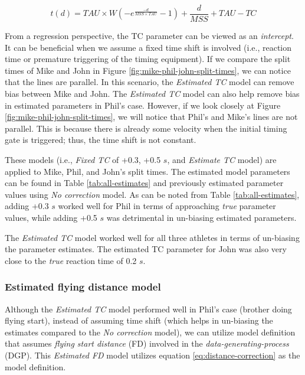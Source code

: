 \documentclass[fleqn,10pt]{wlpeerj} %
\begin{document}
\begin{equation}
  t(d) = TAU \times W(-e^{\frac{-d}{MSS \times TAU}} - 1) + \frac{d}{MSS} + TAU - TC \label{eq:time-correction}
\end{equation}

From a regression perspective, the TC parameter can be viewed as an \emph{intercept}. It can be beneficial when we assume a fixed time shift is involved (i.e., reaction time or premature triggering of the timing equipment). If we compare the split times of Mike and John in Figure \ref{fig:mike-phil-john-split-times}, we can notice that the lines are parallel. In this scenario, the \emph{Estimated TC} model can remove bias between Mike and John. The \emph{Estimated TC} model can also help remove bias in estimated parameters in Phil's case. However, if we look closely at Figure \ref{fig:mike-phil-john-split-times}, we will notice that Phil's and Mike's lines are not parallel. This is because there is already some velocity when the initial timing gate is triggered; thus, the time shift is not constant.

These models (i.e., \emph{Fixed TC} of +0.3, +0.5 \(s\), and \emph{Estimate TC} model) are applied to Mike, Phil, and John's split times. The estimated model parameters can be found in Table \ref{tab:all-estimates} and previously estimated parameter values using \emph{No correction} model. As can be noted from Table \ref{tab:all-estimates}, adding +0.3 \(s\) worked well for Phil in terms of approaching \emph{true} parameter values, while adding +0.5 \(s\) was detrimental in un-biasing estimated parameters.

The \emph{Estimated TC} model worked well for all three athletes in terms of un-biasing the parameter estimates. The estimated TC parameter for John was also very close to the \emph{true} reaction time of 0.2 \(s\).

\hypertarget{estimated-flying-distance-model}{%
\subsubsection{Estimated flying distance model}\label{estimated-flying-distance-model}}

Although the \emph{Estimated TC} model performed well in Phil's case (brother doing flying start), instead of assuming time shift (which helps in un-biasing the estimates compared to the \emph{No correction} model), we can utilize model definition that assumes \emph{flying start distance} (FD) involved in the \emph{data-generating-process} (DGP). This \emph{Estimated FD} model utilizes equation \eqref{eq:distance-correction} as the model definition.
\end{document}
